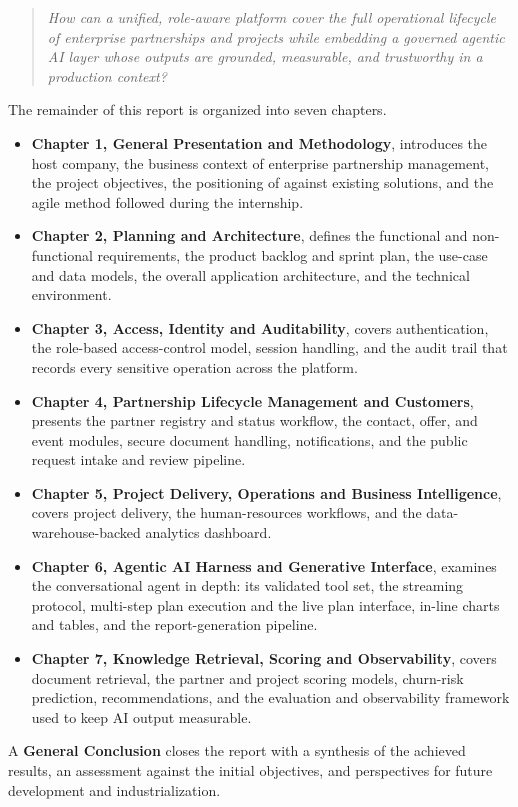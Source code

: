 \begin{quote}
\itshape
How can a unified, role-aware platform cover the full operational lifecycle of enterprise partnerships and projects while embedding a governed agentic AI layer whose outputs are grounded, measurable, and trustworthy in a production context?
\end{quote}

\medskip

\noindent
The remainder of this report is organized into seven chapters.

\begin{itemize}
  \item \textbf{Chapter 1, General Presentation and Methodology}, introduces the host company, the business context of enterprise partnership management, the project objectives, the positioning of \projectname{} against existing solutions, and the agile method followed during the internship.

  \item \textbf{Chapter 2, Planning and Architecture}, defines the functional and non-functional requirements, the product backlog and sprint plan, the use-case and data models, the overall application architecture, and the technical environment.

  \item \textbf{Chapter 3, Access, Identity and Auditability}, covers authentication, the role-based access-control model, session handling, and the audit trail that records every sensitive operation across the platform.

  \item \textbf{Chapter 4, Partnership Lifecycle Management and Customers}, presents the partner registry and status workflow, the contact, offer, and event modules, secure document handling, notifications, and the public request intake and review pipeline.

  \item \textbf{Chapter 5, Project Delivery, Operations and Business Intelligence}, covers project delivery, the human-resources workflows, and the data-warehouse-backed analytics dashboard.

  \item \textbf{Chapter 6, Agentic AI Harness and Generative Interface}, examines the conversational agent in depth: its validated tool set, the streaming protocol, multi-step plan execution and the live plan interface, in-line charts and tables, and the report-generation pipeline.

  \item \textbf{Chapter 7, Knowledge Retrieval, Scoring and Observability}, covers document retrieval, the partner and project scoring models, churn-risk prediction, recommendations, and the evaluation and observability framework used to keep AI output measurable.
\end{itemize}

\medskip

\noindent
A \textbf{General Conclusion} closes the report with a synthesis of the achieved results, an assessment against the initial objectives, and perspectives for future development and industrialization.
